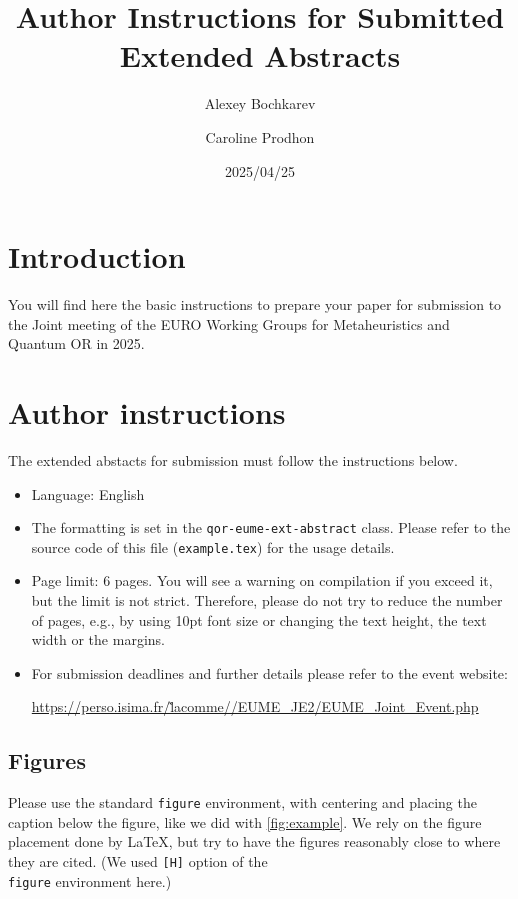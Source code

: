 \documentclass{qor-eume-ext-abstract}
\title{Author Instructions for Submitted Extended Abstracts}
\author[1]{Alexey Bochkarev}
\author[2]{Caroline Prodhon}
\date{2025/04/25}
\begin{document}
\maketitle

\section{Introduction}
You will find here the basic instructions to prepare your paper for submission
to the Joint meeting of the EURO Working Groups for Metaheuristics and Quantum
OR in 2025.

\section{Author instructions}
The extended abstacts for submission must follow the instructions below.

\begin{itemize}
  \item Language: English
  \item The formatting is set in the \texttt{qor-eume-ext-abstract} class.
        Please refer to the source code of this file (\texttt{example.tex}) for
        the usage details.
  \item Page limit: 6 pages. You will see a warning on compilation if you exceed
        it, but the limit is not strict. Therefore, please do not try to reduce
        the number of pages, e.g., by using 10pt font size or changing the text height,
        the text width or the margins.
  \item For submission deadlines and further details please refer to the event
        website:
        \begin{center} \href{https://perso.isima.fr/~lacomme/EUME_JE2/EUME_Joint_Event.php}{https://perso.isima.fr/\~lacomme//EUME\_JE2/EUME\_Joint\_Event.php}
        \end{center}
\end{itemize}

\subsection{Figures}
Please use the standard \texttt{figure} environment, with centering and placing
the caption below the figure, like we did with \cref{fig:example}. We rely on
the figure placement done by \LaTeX, but try to have the figures reasonably
close to where they are cited. (We used \texttt{[H]} option of the
\texttt{\\figure} environment here.)
\end{document}
